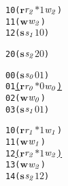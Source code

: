 \newsavebox{\boxnoone}
\begin{lrbox}{\boxnoone}
\begin{minipage}[t]{0.65\linewidth}
\large
\begin{alltt}
10 (\(\mathbf{r}\) \(\mathit{r\sb{2}}\) \(\mathit{\ast 1}\) \(\mathit{w\sb{2}}\)) 
11 (\(\mathbf{w}\) \(\mathit{w\sb{2}}\))
12 (\(\mathbf{s}\) \(\mathit{s\sb{1}}\) \(\mathit{1 0}\))
\end{alltt}
\end{minipage}
\end{lrbox}

\newsavebox{\boxnotwo}
\begin{lrbox}{\boxnotwo}
\begin{minipage}[t]{0.65\linewidth}
\large
\begin{alltt}
20 (\(\mathbf{s}\) \(\mathit{s\sb{2}}\) \(\mathit{2 0}\))
\end{alltt}
\end{minipage}
\end{lrbox}


\newcommand\examplefigtwo{
\begin{figure*}[tb]
\begin{center}
\setlength{\tabcolsep}{2pt}
\begin{tabular}[t]{c|c|c}
$\mathit{p_0}$ & $\mathit{p_1}$ & $\mathit{p_2}$ \\
\hline
\scalebox{0.8}{\usebox{\boxnozero}}&
\scalebox{0.8}{\usebox{\boxnoone}} &
\scalebox{0.8}{\usebox{\boxnotwo}}\\
\end{tabular}
\end{center}
\caption{No Deadlock Caused by Orphaned Receive}
\label{fig:nodeadlock1}
\end{figure*}
}


\newsavebox{\boxone}
\begin{lrbox}{\boxone}
\begin{minipage}[t]{0.65\linewidth}
\large
\begin{alltt}
00 (\(\mathbf{s}\) \(\mathit{s\sb{0}}\) \(\mathit{0 1}\)) 
01 \underline{(\(\mathbf{r}\) \(\mathit{r\sb{0}}\) \(\mathit{\ast 0}\) \(\mathit{w\sb{0}}\))}
02 (\(\mathbf{w}\) \(\mathit{w\sb{0}}\)) 
03 (\(\mathbf{s}\) \(\mathit{s\sb{1}}\) \(\mathit{0 1}\))
\end{alltt}
\end{minipage}
\end{lrbox}

\newsavebox{\boxtwo}
\begin{lrbox}{\boxtwo}
\begin{minipage}[t]{0.65\linewidth}
\large
\begin{alltt}
10 (\(\mathbf{r}\) \(\mathit{r\sb{1}}\) \(\mathit{\ast 1}\) \(\mathit{w\sb{1}}\)) 
11 (\(\mathbf{w}\) \(\mathit{w\sb{1}}\))
12 \underline{(\(\mathbf{r}\) \(\mathit{r\sb{2}}\) \(\mathit{\ast 1}\) \(\mathit{w\sb{2}}\))}
13 (\(\mathbf{w}\) \(\mathit{w\sb{2}}\)) 
14 (\(\mathbf{s}\) \(\mathit{s\sb{2}}\) \(\mathit{1 2}\))
\end{alltt}
\end{minipage}
\end{lrbox}

